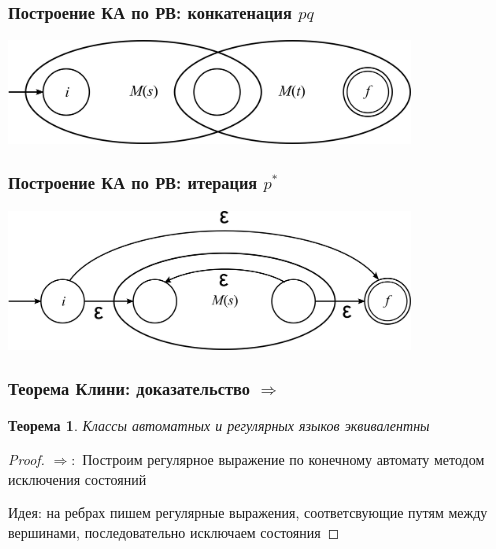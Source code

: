 \documentclass{beamer}
\newtheorem{rutheorem}{Теорема}
\begin{document}
\begin{frame}
  \transwipe[direction=90]
  \frametitle{Построение КА по РВ: конкатенация $p q$}
    \begin{center}
      \includegraphics[width=0.80\textwidth]{pics/concat.png}
    \end{center}
\end{frame}

\begin{frame}
  \transwipe[direction=90]
  \frametitle{Построение КА по РВ: итерация $p^*$}
    \begin{center}
      \includegraphics[width=0.80\textwidth]{pics/star.png}
    \end{center}
\end{frame}

\begin{frame}
  \transwipe[direction=90]
  \frametitle{Теорема Клини: доказательство $\Rightarrow$}

  \begin{rutheorem}
   Классы автоматных и регулярных языков \emph{эквивалентны}
  \end{rutheorem}

  \begin{proof}
   $\Rightarrow: $
    Построим регулярное выражение по конечному автомату методом исключения состояний

    Идея: на ребрах пишем регулярные выражения, соответсвующие путям между вершинами, последовательно исключаем состояния

  \end{proof}
\end{frame}
\end{document}
